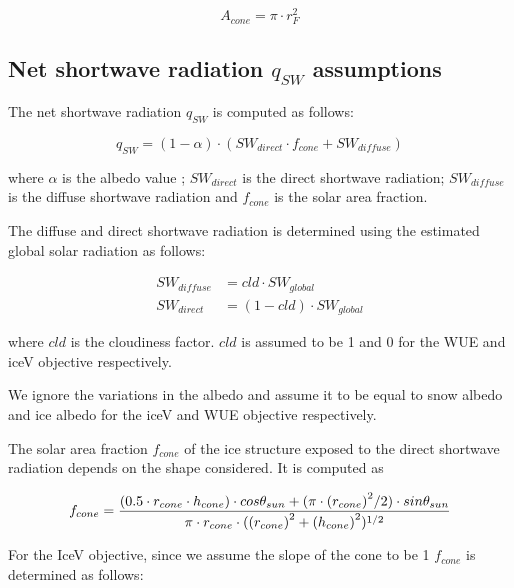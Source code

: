 \documentclass[tc, manuscript]{copernicus}
\begin{document}
\begin{equation} A_{cone} =\pi \cdot r_{F}^2 \label{eq:Area} \end{equation}

\subsection{Net shortwave radiation \texorpdfstring{$q_{SW}$}{Lg} assumptions}
\label{sec:SW}

The net shortwave radiation $q_{SW}$ is computed as follows:

\begin{equation} q_{SW} = (1- \alpha) \cdot ( SW_{direct} \cdot f_{cone} + SW_{diffuse})
\label{eqn:SW} \end{equation}

where $\alpha$ is the albedo value ; $SW_{direct}$ is the direct shortwave radiation; $SW_{diffuse}$ is the
diffuse shortwave radiation and $f_{cone}$ is the solar area fraction.

The diffuse and direct shortwave radiation is determined using the estimated global solar radiation as follows:

\begin{equation}
\begin{split}
  SW_{diffuse} &= cld \cdot SW_{global}\\
  SW_{direct} &= (1-cld) \cdot SW_{global}
\end{split}
\end{equation}

where $cld$ is the cloudiness factor. $cld$ is assumed to be 1 and 0 for the WUE and iceV objective
respectively.

We ignore the variations in the albedo and assume it to be equal to snow albedo and ice albedo for the iceV and
WUE objective respectively. 

The solar area fraction $f_{cone}$ of the ice structure exposed to the direct shortwave radiation depends on the
shape considered. It is computed as

\begin{equation}
		f_{cone} =\frac{(0.5 \cdot r_{cone} \cdot h_{cone}) \cdot cos \theta_{sun} +(\pi \cdot
			{(r_{cone})}^2/2) \cdot sin \theta_{sun} }{\pi \cdot r_{cone} \cdot ({(r_{cone})}^2+{(h_{cone})}^2)^{1/2}}\\
\end{equation}

For the IceV objective, since we assume the slope of the cone to be 1 $f_{cone}$ is determined
as follows:
\end{document}
